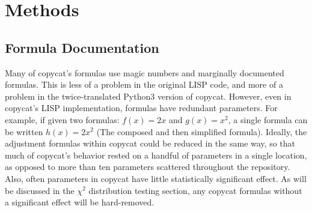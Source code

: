 \documentclass[a4paper]{article}
\begin{document}


\section{Methods}
    \subsection{Formula Documentation}
        Many of copycat's formulas use magic numbers and marginally documented formulas.
        This is less of a problem in the original LISP code, and more of a problem in the twice-translated Python3 version of copycat.
        However, even in copycat's LISP implementation, formulas have redundant parameters.
        For example, if given two formulas: $f(x) = 2x$ and $g(x) = x^2$, a single formula can be written $h(x) = 2x^2$ (The composed and then simplified formula).
        Ideally, the adjustment formulas within copycat could be reduced in the same way, so that much of copycat's behavior rested on a handful of parameters in a single location, as opposed to more than ten parameters scattered throughout the repository.
        Also, often parameters in copycat have little statistically significant effect.
        As will be discussed in the $\chi^2$ distribution testing section, any copycat formulas without a significant effect will be hard-removed.
\end{document}
